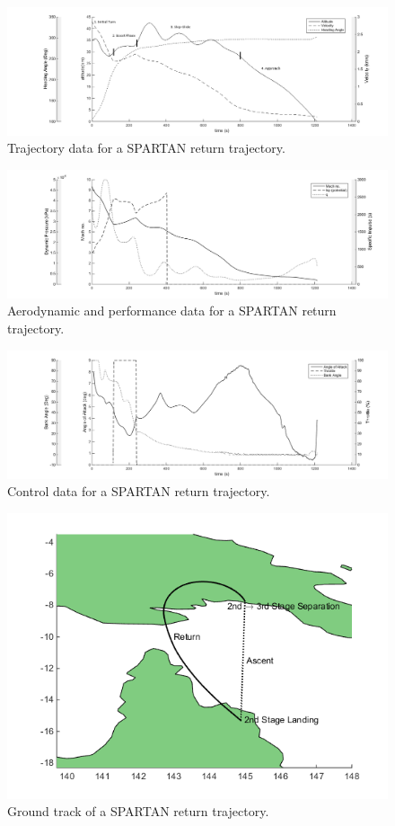 \documentclass[conf]{new-aiaa}
\begin{document}
\begin{figure}
\centering
\includegraphics[width=0.9\linewidth]{Figures/Traj1}
\caption{Trajectory data for a SPARTAN return trajectory.}
\label{fig:Traj1}
\end{figure}
\begin{figure}
\centering
\includegraphics[width=0.9\linewidth]{Figures/Traj2}
\caption{Aerodynamic and performance data for a SPARTAN return trajectory.}
\label{fig:Traj2}
\end{figure}
\begin{figure}
\centering
\includegraphics[width=0.9\linewidth]{Figures/Traj3}
\caption{Control data for a SPARTAN return trajectory.}
\label{fig:Traj3}
\end{figure}

\begin{figure}
\centering
\includegraphics[width=0.7\linewidth]{Figures/lon-lat}
\caption{Ground track of a SPARTAN return trajectory.}
\label{fig:lon-lat}
\end{figure}
\end{document}
